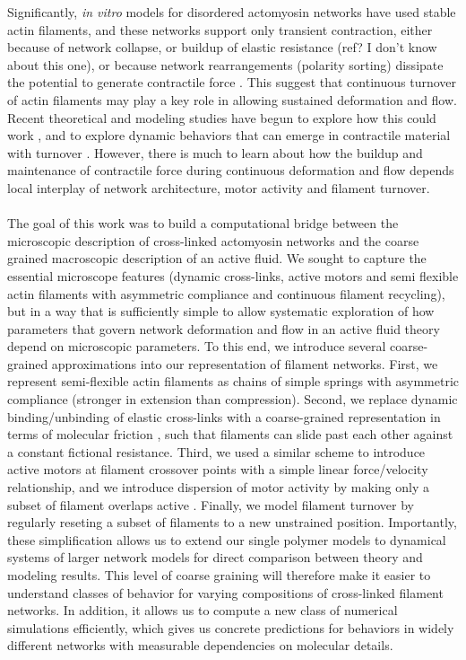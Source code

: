 \documentclass[10pt,letterpaper]{article}
\begin{document}
Significantly, {\em in vitro} models for disordered actomyosin networks have used stable actin filaments, and these networks support only transient contraction, either because of network collapse\cite{Alvarado:2013aa}, or buildup of elastic resistance (ref? I don't know about this one), or because network rearrangements (polarity sorting) dissipate the potential to generate contractile force \cite{Ndlec:1997aa,Surrey1167}. This suggest that continuous turnover of actin filaments may play a key role in allowing sustained deformation and flow. Recent theoretical and modeling studies have begun to explore how this could work \cite{2015arXiv150706182H,Mak:2016aa,10.1371/journal.pone.0000696}, and to explore dynamic behaviors that can emerge in contractile material with turnover \cite{PhysRevLett.113.148102}. However, there is much to learn about how the buildup and maintenance of contractile force during continuous deformation and flow depends local interplay of network architecture, motor activity and filament turnover.



\paragraph{}  The goal of this work was to build a computational bridge between the microscopic description of cross-linked actomyosin networks and the coarse grained macroscopic description of an active fluid.  We sought to capture the essential microscope features (dynamic cross-links, active motors and semi flexible actin filaments with asymmetric compliance and continuous filament recycling), but in a way that is sufficiently simple to allow systematic exploration of how parameters that govern network deformation and flow in an active fluid theory depend on microscopic parameters. To this end, we introduce several coarse-grained approximations into our representation of filament networks. First, we represent semi-flexible actin filaments as chains of simple springs with asymmetric compliance (stronger in extension than compression). Second, we replace  dynamic binding/unbinding of elastic cross-links with a coarse-grained representation in terms of molecular friction \cite{theo_friction,theo_frictionSam,theo_molefric}, such that filaments can slide past each other against a constant fictional resistance. Third, we used a similar scheme to introduce active motors at filament crossover points with a simple linear force/velocity relationship, and we introduce dispersion of motor activity by making only a subset of filament overlaps active \cite{theo_frictionShila}.  Finally, we model filament turnover by regularly reseting a subset of filaments to a new unstrained position. Importantly, these simplification allows us to extend our single polymer models to dynamical systems of larger network models for direct comparison between theory and modeling results. This level of coarse graining will therefore make it easier to understand classes of behavior for varying compositions of cross-linked filament networks. In addition, it allows us to compute a new class of numerical simulations efficiently, which gives us concrete predictions for behaviors in widely different networks with measurable dependencies on molecular details. 
  
\end{document}
